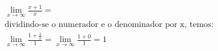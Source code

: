\begin{ex}
\begin{align}
&\lim_{x\rightarrow \infty} \frac{x+1}{x}=\nonumber\\
&\text{dividindo-se o numerador e o denominador por x, temos:}\nonumber\\
&\lim_{x\rightarrow \infty} \frac{1+\frac{1}{x}}{1}=\lim_{x\rightarrow \infty} \frac{1+0}{1} = 1\nonumber
\end{align}
\end{ex}

